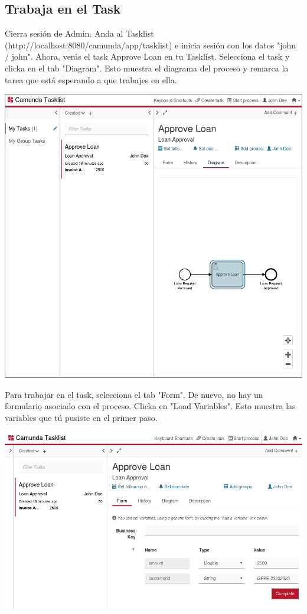 \documentclass{article}
\begin{document}
\subsection{Trabaja en el Task}

Cierra sesión de Admin. Anda al Tasklist (http://localhost:8080/camunda/app/tasklist) e inicia sesión con los datos "john / john". Ahora, verás el task Approve Loan en tu Tasklist. Selecciona el task y clicka en el tab "Diagram". Esto muestra el diagrama del proceso y remarca la tarea que está esperando a que trabajes en ella.

\begin{center}
\includegraphics[width=\textwidth]{diagram.png}
\end{center}

Para trabajar en el task, selecciona el tab "Form". De nuevo, no hay un formulario asociado con el proceso. Clicka en "Load Variables". Esto muestra las variables que tú pusiste en el primer paso.

\begin{center}
\includegraphics[width=\textwidth]{task-form-generic.png}
\end{center}
\end{document}
